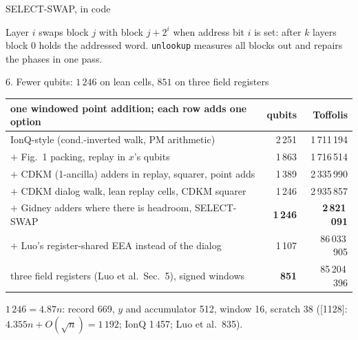 \documentclass[aspectratio=169,11pt]{beamer}
\newcommand{\code}[2][]{}
\begin{document}
\begin{frame}[fragile]{SELECT-SWAP, in code}
  \code[basicstyle=\ttfamily\footnotesize]{select_swap.py}
  \vskip2mm
  Layer $i$ swaps block $j$ with block $j+2^i$ when address bit $i$ is set: after $k$ layers block 0 holds the addressed word. \texttt{unlookup} measures all blocks out and repairs the phases in one pass.
\end{frame}

\begin{frame}{6. Fewer qubits: $1\,246$ on lean cells, $851$ on three field registers}
  \centering\small
  \renewcommand{\arraystretch}{1.15}
  \begin{tabular}{@{}lrr@{}}
    \toprule
    one windowed point addition; each row adds one option & qubits & Toffolis \\
    \midrule
    IonQ-style (cond.-inverted walk, PM arithmetic) & 2\,251 & 1\,711\,194 \\
    $+$ Fig.~1 packing, replay in $x$'s qubits & 1\,863 & 1\,716\,514 \\
    $+$ CDKM (1-ancilla) adders in replay, squarer, point adds & 1\,389 & 2\,335\,990 \\
    $+$ CDKM dialog walk, lean replay cells, CDKM squarer & 1\,246 & 2\,935\,857 \\
    $+$ Gidney adders where there is headroom, SELECT-SWAP & \textbf{1\,246} & \textbf{2\,821\,091} \\
    $+$ Luo's register-shared EEA instead of the dialog & 1\,107 & 86\,033\,905 \\
    three field registers (Luo et al.\ Sec.~5), signed windows & \textbf{851} & 85\,204\,396 \\
    \bottomrule
  \end{tabular}
  \vskip2mm
  \raggedright{\small $1\,246=4.87n$: record 669, $y$ and accumulator 512, window 16, scratch 38 ([1128]: $4.355n+O(\sqrt n)=1\,192$; IonQ 1\,457; Luo et al.\ 835).}
\end{frame}
\end{document}
